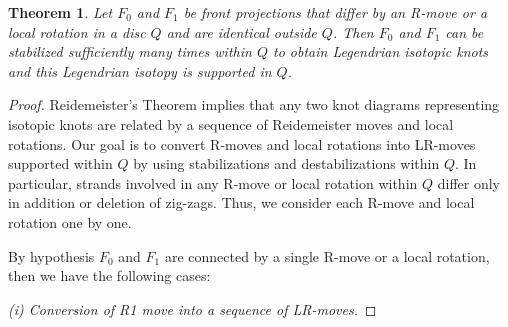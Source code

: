 \documentclass[11pt]{amsart}
\numberwithin{equation}{section}
\theoremstyle{plain}
\newtheorem{theorem}[equation]{Theorem}
\theoremstyle{definition}
\theoremstyle{remark} \newtheorem{remark}[equation]{Remark}
\theoremstyle{remark} \newtheorem{observation}[equation]{Observation}
\begin{document}
\begin{theorem}\label{CostL1}
    Let $F_0$ and $F_1$ be front projections that differ by an R-move or a local rotation in a disc $Q$ and are identical outside $Q$. Then $F_0$ and $F_1$ can be stabilized sufficiently many times within $Q$ to obtain Legendrian isotopic knots and this Legendrian isotopy is supported in $Q$.
\end{theorem}
\begin{proof}
   Reidemeister's Theorem \cite{R} implies that any two knot diagrams representing isotopic knots are related by a sequence of Reidemeister moves and local rotations. Our goal is to convert R-moves and local rotations into LR-moves supported within $Q$ by using stabilizations and destabilizations within $Q$.  In particular, strands involved in any R-move or local rotation within $Q$ differ only in addition or deletion of zig-zags. Thus, we consider each R-move and local rotation one by one. 
   
   By hypothesis $F_0$ and $F_1$ are connected by a single R-move or a local rotation, then we have the following cases: 
   
   
   \noindent  \textit{(i) Conversion of R1 move into a sequence of LR-moves.}
   

\end{proof}
\end{document}
